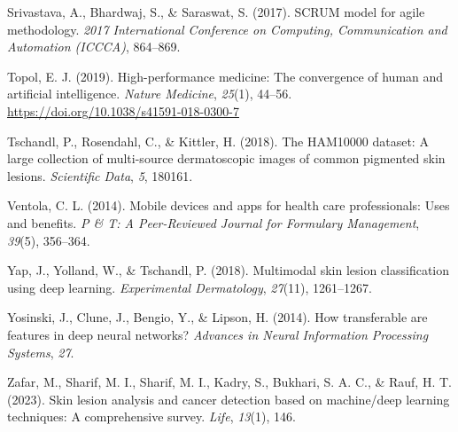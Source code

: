 \documentclass[
  12pt,
  oneside]{article}
\newlength{\cslhangindent}
\newenvironment{CSLReferences}[2] %
 {\begin{list}{}{%
  \setlength{\itemindent}{0pt}
  \setlength{\leftmargin}{0pt}
  \setlength{\parsep}{0pt}
  \ifodd #1
   \setlength{\leftmargin}{\cslhangindent}
   \setlength{\itemindent}{-1\cslhangindent}
  \fi
  \setlength{\itemsep}{#2\baselineskip}}}
 {\end{list}}
\begin{document}
\begin{CSLReferences}{1}{0}
Srivastava, A., Bhardwaj, S., \& Saraswat, S. (2017). SCRUM model for
agile methodology. \emph{2017 International Conference on Computing,
Communication and Automation (ICCCA)}, 864--869.

Topol, E. J. (2019). High-performance medicine: The convergence of human
and artificial intelligence. \emph{Nature Medicine}, \emph{25}(1),
44--56. \url{https://doi.org/10.1038/s41591-018-0300-7}

Tschandl, P., Rosendahl, C., \& Kittler, H. (2018). The HAM10000
dataset: A large collection of multi-source dermatoscopic images of
common pigmented skin lesions. \emph{Scientific Data}, \emph{5}, 180161.

Ventola, C. L. (2014). Mobile devices and apps for health care
professionals: Uses and benefits. \emph{P \& T: A Peer-Reviewed Journal
for Formulary Management}, \emph{39}(5), 356--364.

Yap, J., Yolland, W., \& Tschandl, P. (2018). Multimodal skin lesion
classification using deep learning. \emph{Experimental Dermatology},
\emph{27}(11), 1261--1267.

Yosinski, J., Clune, J., Bengio, Y., \& Lipson, H. (2014). How
transferable are features in deep neural networks? \emph{Advances in
Neural Information Processing Systems}, \emph{27}.

Zafar, M., Sharif, M. I., Sharif, M. I., Kadry, S., Bukhari, S. A. C.,
\& Rauf, H. T. (2023). Skin lesion analysis and cancer detection based
on machine/deep learning techniques: A comprehensive survey.
\emph{Life}, \emph{13}(1), 146.

\end{CSLReferences}
\end{document}
